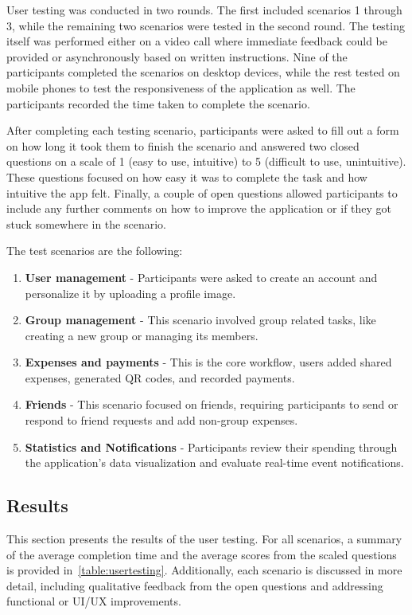 \documentclass{ctuthesis}
\begin{document}
User testing was conducted in two rounds. The first included scenarios 1 through 3, while the remaining two scenarios were tested in the second round. The testing itself was performed either on a video call where immediate feedback could be provided or asynchronously based on written instructions. Nine of the participants completed the scenarios on desktop devices, while the rest tested on mobile phones to test the responsiveness of the application as well. The participants recorded the time taken to complete the scenario.

After completing each testing scenario, participants were asked to fill out a form on how long it took them to finish the scenario and answered two closed questions on a scale of 1 (easy to use, intuitive) to 5 (difficult to use, unintuitive). These questions focused on how easy it was to complete the task and how intuitive the app felt. Finally, a couple of open questions allowed participants to include any further comments on how to improve the application or if they got stuck somewhere in the scenario.

The test scenarios are the following:
\begin{enumerate}
    \item \textbf{User management} - Participants were asked to create an account and personalize it by uploading a profile image.
    \item \textbf{Group management} - This scenario involved group related tasks, like creating a new group or managing its members.
    \item \textbf{Expenses and payments} - This is the core workflow, users added shared expenses, generated QR codes, and recorded payments.
    \item \textbf{Friends} - This scenario focused on friends, requiring participants to send or respond to friend requests and add non-group expenses.
    \item \textbf{Statistics and Notifications} - Participants review their spending through the application's data visualization and evaluate real-time event notifications.
\end{enumerate}

\subsection{Results}
This section presents the results of the user testing. For all scenarios, a summary of the average completion time and the average scores from the scaled questions is provided in~\autoref{table:usertesting}. Additionally, each scenario is discussed in more detail, including qualitative feedback from the open questions and addressing functional or UI/UX improvements.
\end{document}
